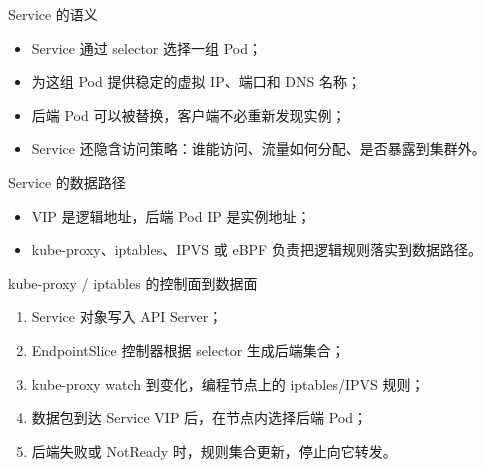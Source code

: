 \documentclass[UTF8,fontset=none,aspectratio=169,10pt]{beamer}
\begin{document}

\begin{frame}{Service 的语义}
\begin{itemize}
  \item Service 通过 selector 选择一组 Pod；
  \item 为这组 Pod 提供稳定的虚拟 IP、端口和 DNS 名称；
  \item 后端 Pod 可以被替换，客户端不必重新发现实例；
  \item Service 还隐含访问策略：谁能访问、流量如何分配、是否暴露到集群外。
\end{itemize}
\vfill
{}
\end{frame}

\begin{frame}{Service 的数据路径}
\begin{center}
\end{center}
\begin{itemize}
  \item VIP 是逻辑地址，后端 Pod IP 是实例地址；
  \item kube-proxy、iptables、IPVS 或 eBPF 负责把逻辑规则落实到数据路径。
\end{itemize}
\end{frame}

\begin{frame}{kube-proxy / iptables 的控制面到数据面}
\begin{enumerate}
  \item Service 对象写入 API Server；
  \item EndpointSlice 控制器根据 selector 生成后端集合；
  \item kube-proxy watch 到变化，编程节点上的 iptables/IPVS 规则；
  \item 数据包到达 Service VIP 后，在节点内选择后端 Pod；
  \item 后端失败或 NotReady 时，规则集合更新，停止向它转发。
\end{enumerate}
\vfill
{}
\end{frame}
\end{document}
